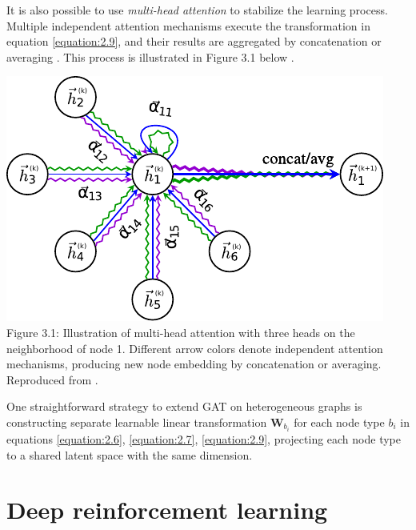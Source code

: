 \par
It is also possible to use \textit{multi-head attention} to stabilize the learning process. Multiple independent attention mechanisms execute the transformation in equation \ref{equation:2.9}, and their results are aggregated by concatenation or averaging \cite{veličković2018graph}. This process is illustrated in Figure 3.1 below \cite{veličković2018graph}.
\begin{center}
    \includegraphics[width=0.5\linewidth]{images/graph_attention_network_pdfa.pdf}\\
    Figure 3.1: Illustration of multi-head attention with three heads on the neighborhood of node 1. Different arrow colors denote independent attention mechanisms, producing new node embedding by concatenation or averaging. Reproduced from \cite{veličković2018graph}.
\end{center}
One straightforward strategy to extend GAT on heterogeneous graphs is constructing separate learnable linear transformation $\boldsymbol{W}_{b_i}$ for each node type $b_i$ in equations \ref{equation:2.6}, \ref{equation:2.7}, \ref{equation:2.9}, projecting each node type to a shared latent space with the same dimension.

\section{Deep reinforcement learning}

